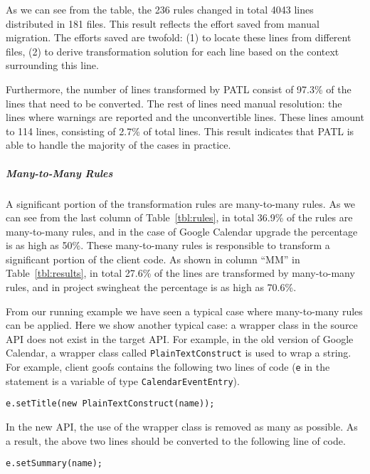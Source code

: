 \documentclass[letterpaper, USenglish]{lipics-v2016}
\newenvironment{smpage}[1]
{\begin{lrbox}{\fmbox}\begin{minipage}{#1}}
{\end{minipage}\end{lrbox}\usebox{\fmbox}}
\newcommand{\code}[1]{\texttt{\footnotesize #1}}
\newcommand{\PATL}{PATL\xspace}
\theoremstyle{plain}
\begin{document}
As we can see from the table, the 236 rules changed
in total 4043 lines distributed in 181 files. This result reflects the
effort saved from manual migration. The efforts saved are twofold: (1)
to locate these lines from different files, (2) to derive
transformation solution for each line based on the context surrounding
this line.

Furthermore, the number of lines transformed by \PATL consist of
97.3\% of the lines that need to be converted. 
The rest of lines need manual resolution: the lines where warnings are
reported and the unconvertible lines. These lines amount to 114 lines,
consisting of 2.7\% of total lines. This result indicates that \PATL
is able to handle the majority of the cases in practice.

\subparagraph*{Many-to-Many Rules}
A significant portion of the transformation rules are many-to-many rules. As
we can see from the last column of Table~\ref{tbl:rules}, in total 36.9\%
of the rules are many-to-many rules, and in the case of Google
Calendar upgrade the
percentage is as high as 50\%. These many-to-many rules is responsible
to transform a significant portion of the client code. As shown in
column ``MM'' in Table~\ref{tbl:results}, in total 27.6\% of the lines
are transformed by many-to-many rules, and in project swingheat the
percentage is as high as 70.6\%. 

From our running example we have seen a typical case where
many-to-many rules can be applied. Here we show another typical case:
a wrapper class in the source API does not
exist in the target API. For example, in the old version of Google Calendar, a
wrapper class called \code{PlainTextConstruct} is used to wrap a
string. For example, client goofs contains the following two lines of code (\code{e} in the statement is a variable of type \code{CalendarEventEntry}).

\begin{center}
\begin{smpage}{0.55\columnwidth}
\begin{lstlisting}[style=java,frame=none,numbers=none]
e.setTitle(new PlainTextConstruct(name));
\end{lstlisting}
\end{smpage}
\end{center}
\vspace{-8pt}
In the new API, the use of the wrapper class is removed as many as
possible. As a result, the above two lines should be converted to the
following line of code. 
\vspace{-8pt}
\begin{center}
\begin{smpage}{0.3\columnwidth}
\begin{lstlisting}[style=java,frame=none,numbers=none]
e.setSummary(name);
\end{lstlisting}
\end{smpage}
\end{center}
\end{document}
